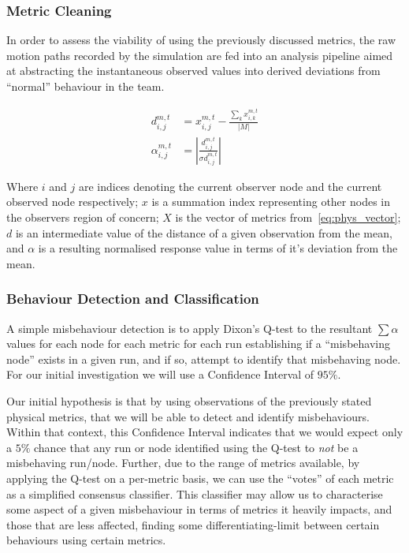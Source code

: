 \subsubsection{Metric Cleaning}
In order to assess the viability of using the previously discussed metrics, the raw motion paths recorded by the simulation are fed into an analysis pipeline aimed at abstracting the instantaneous observed values into derived deviations from ``normal'' behaviour in the team.

\begin{align}
  d_{i,j}^{m,t} &= x_{i,j}^{m,t} - \frac{\sum_k x_{i,k}^{m,t}}{|M|}\label{eq:d}\\
  \alpha_{i,j}^{m,t} &= | \frac{d_{i,j}^{m,t}}{\sigma{d_{i,j}^{m,t}}}|\label{eq:dd}
\end{align}

Where $i$ and $j$ are indices denoting the current observer node and the current observed node respectively; $x$ is a summation index representing other nodes in the observers region of concern; $X$ is the vector of metrics from~\ref{eq:phys_vector}; $d$ is an intermediate value of the distance of a given observation from the mean, and $\alpha$ is a resulting normalised response value in terms of it's deviation from the mean.

\subsubsection{Behaviour Detection and Classification}
A simple misbehaviour detection is to apply Dixon's Q-test \cite{Dean1951} to the resultant $\sum\alpha$ values for each node for each metric for each run establishing if a ``misbehaving node'' exists in a given run, and if so, attempt to identify that misbehaving node. 
For our initial investigation we will use a Confidence Interval of $95\%$.

Our initial hypothesis is that by using observations of the previously stated physical metrics, that we will be able to detect and identify misbehaviours.
Within that context, this Confidence Interval indicates that we would expect only a $5\%$ chance that any run or node identified using the Q-test to \emph{not} be a misbehaving run/node.
Further, due to the range of metrics available, by applying the Q-test on a per-metric basis, we can use the ``votes'' of each metric as a simplified consensus classifier.
This classifier may allow us to characterise some aspect of a given misbehaviour in terms of metrics it heavily impacts, and those that are less affected, finding some differentiating-limit between certain behaviours using certain metrics.

